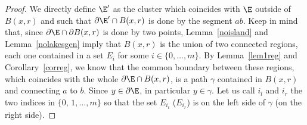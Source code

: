 \begin{proof}
We directly define $\E'$ as the cluster which coincides with $\E$ outside of $B(x,r)$ and such that $\partial\E'\cap B(x,r)$ is done by the segment $ab$. Keep in mind that, since $\partial\E\cap \partial B(x,r)$ is done by two points, Lemma~\ref{noisland} and Lemma~\ref{nolakesgen} imply that $B(x,r)$ is the union of two connected regions, each one contained in a set $E_i$ for some $i\in\{0,\dots,m\}$. By Lemma~\ref{lem1reg} and Corollary~\ref{correg}, we know that the common boundary between these regions, which coincides with the whole $\partial\E\cap B(x,r)$, is a path $\gamma$ contained in $B(x,r)$ and connecting $a$ to $b$. Since $y\in\partial\E$, in particular $y\in\gamma$. Let us call $i_l$ and $i_r$ the two indices in $\{0,\, 1 ,\dots, m\}$ so that the set $E_{i_l}$ (\resp $E_{i_r}$) is on the left side of $\gamma$ (\resp on the right side).


\end{proof}
